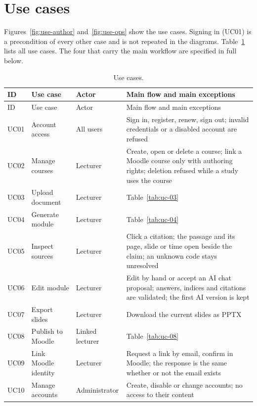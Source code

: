 \clearpage\section{Use cases}\label{sec:usecases}
Figures~\ref{fig:use-author} and~\ref{fig:use-ops} show the use cases. Signing in (UC01) is a precondition of every other case and is not repeated in the diagrams.
Table~\ref{tab:uc-summary} lists all use cases. The four that carry the main workflow are specified in full below.
\begin{longtable}{|p{1.2cm}|p{3.6cm}|p{2.9cm}|p{6.9cm}|}\caption{Use cases.}\label{tab:uc-summary}\\\hline
ID & Use case & Actor & Main flow and main exceptions\\\hline\endfirsthead
\hline ID & Use case & Actor & Main flow and main exceptions\\\hline\endhead
UC01 & Account access & All users & Sign in, register, renew, sign out; invalid credentials or a disabled account are refused\\\hline
UC02 & Manage courses & Lecturer & Create, open or delete a course; link a Moodle course only with authoring rights; deletion refused while a study uses the course\\\hline
UC03 & Upload document & Lecturer & Table~\ref{tab:uc-03}\\\hline
UC04 & Generate module & Lecturer & Table~\ref{tab:uc-04}\\\hline
UC05 & Inspect sources & Lecturer & Click a citation; the passage and its page, slide or time open beside the claim; an unknown code stays unresolved\\\hline
UC06 & Edit module & Lecturer & Edit by hand or accept an AI chat proposal; answers, indices and citations are validated; the first AI version is kept\\\hline
UC07 & Export slides & Lecturer & Download the current slides as PPTX\\\hline
UC08 & Publish to Moodle & Linked lecturer & Table~\ref{tab:uc-08}\\\hline
UC09 & Link Moodle identity & Lecturer & Request a link by email, confirm in Moodle; the response is the same whether or not the email exists\\\hline
UC10 & Manage accounts & Administrator & Create, disable or change accounts; no access to their content\\\hline

\end{longtable}
